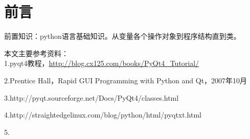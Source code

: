 \documentclass[12pt,oneside]{book}
\begin{document}
\frontmatter

\author{万泽}
\titleLA

\chapter*{前言}
\begin{common-format}
前置知识：python语言基础知识。从变量各个操作对象到程序结构直到类。


本文主要参考资料：\\
1.pyqt4教程，\href{http://blog.cx125.com/books/PyQt4_Tutorial/}{http://blog.cx125.com/books/PyQt4\_{}Tutorial/}

2.Prentice Hall，Rapid GUI Programming with Python and Qt，2007年10月

3.http://pyqt.sourceforge.net/Docs/PyQt4/classes.html

4.http://straightedgelinux.com/blog/python/html/pyqtxt.html

5.



\end{common-format}


\setcounter{tocdepth}{2}
\tableofcontents
\end{document}
